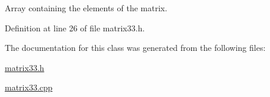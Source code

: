 Array containing the elements of the matrix. 



Definition at line 26 of file matrix33.\-h.



The documentation for this class was generated from the following files\-:\begin{DoxyCompactItemize}
\item 
\hyperlink{matrix33_8h}{matrix33.\-h}\item 
\hyperlink{matrix33_8cpp}{matrix33.\-cpp}\end{DoxyCompactItemize}
